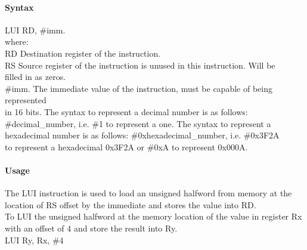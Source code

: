 \documentclass[12pt]{article}
\begin{document}
    \paragraph{Syntax}
    \begin{flushleft}
    LUI RD, \#imm.\\
    \vspace{1em}        %
    where:\\
    \vspace{1em}
    RD  \hspace{3.6em} Destination register of the instruction.\\
    \vspace{1em}
    RS  \hspace{3.85em} Source register of the instruction is unused in this instruction. Will be\\
        \hspace{5.4em} filled in as zeros.\\
    \vspace{1em}
    \#imm.  \hspace{1.8em} The immediate value of the instruction, must be capable of being represented\\             \hspace{5.4em} in 16 bits. The syntax to represent a decimal number is as follows:\\
            \hspace{5.4em} \#decimal\_number, i.e. \#1 to represent a one. The syntax to represent a\\
            \hspace{5.4em} hexadecimal number is as follows: \#0xhexadecimal\_number, i.e. \#0x3F2A \\
            \hspace{5.4em} to represent a hexadecimal 0x3F2A or \#0xA to represent 0x000A.\\
    \end{flushleft}
    
    \paragraph{Usage}
    \begin{flushleft}
    The LUI instruction is used to load an unsigned halfword from memory at the location of RS offset by the immediate and stores the value into RD.\\    
    \vspace{1em}
    To LUI the unsigned halfword at the memory location of the value in register Rx with an offset of 4 and store the result into Ry.\\
    \vspace{1em}
    LUI Ry, Rx, \#4
    \end{flushleft}
    
\end{document}
